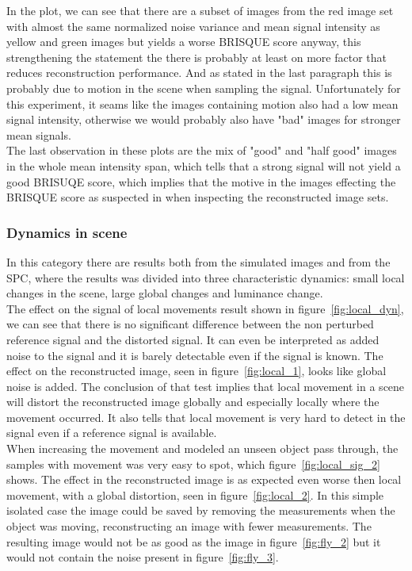 In the plot, we can see that there are a subset of images from the red image set with almost the same normalized noise variance and mean signal intensity as yellow and green images but yields a worse BRISQUE score anyway, this strengthening the statement the there is probably at least on more factor that reduces reconstruction performance. And as stated in the last paragraph this is probably due to motion in the scene when sampling the signal. Unfortunately for this experiment, it seams like the images containing motion also had a low mean signal intensity, otherwise we would probably also have "bad" images for stronger mean signals.\\[0.1in] 

The last observation in these plots are the mix of "good" and "half good" images in the whole mean intensity span, which tells that a strong signal will not yield a good BRISUQE score, which implies that the motive in the images effecting the BRISQUE score as suspected in when inspecting the reconstructed image sets.

\subsubsection{Dynamics in scene}
In this category there are results both from the simulated images and from the SPC, where the results was divided into three characteristic dynamics: small local changes in the scene, large global changes and luminance change.\\[0.1in]

The effect on the signal of local movements result shown in figure~\ref{fig:local_dyn}, we can see that there is no significant difference between the non perturbed reference signal and the distorted signal. It can even be interpreted as added noise to the signal and it is barely detectable even if the signal is known. The effect on the reconstructed image, seen in figure~\ref{fig:local_1}, looks like global noise is added. The conclusion of that test implies that local movement in a scene will distort the reconstructed image globally and especially locally where the movement occurred. It also tells that local movement is very hard to detect in the signal even if a reference signal is available.\\[0.1in]

When increasing the movement and modeled an unseen object pass through, the samples with movement was very easy to spot, which figure~\ref{fig:local_sig_2} shows. The effect in the reconstructed image is as expected even worse then local movement, with a global distortion, seen in figure~\ref{fig:local_2}. In this simple isolated case the image could be saved by removing the measurements when the object was moving, reconstructing an image with fewer measurements. The resulting image would not be as good as the image in figure~\ref{fig:fly_2} but it would not contain the noise present in figure~\ref{fig:fly_3}. \\[0.1in]


